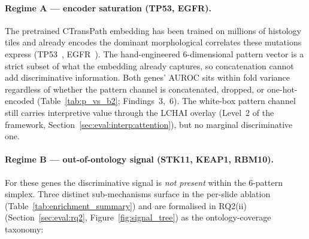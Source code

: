 \paragraph{Regime A --- encoder saturation (TP53, EGFR).}
The pretrained CTransPath embedding has been trained on millions of
histology tiles and already encodes the dominant morphological
correlates these mutations express
(TP53~\cite{ahn2022tp53highgrade},
EGFR~\cite{yoshizawa2013egfrmorph}).
The hand-engineered 6-dimensional pattern vector is a strict subset
of what the embedding already captures, so concatenation cannot
add discriminative information.
Both genes' AUROC sits within fold variance regardless of whether
the pattern channel is concatenated, dropped, or one-hot-encoded
(Table~\ref{tab:p_vs_b2}; Findings~3,~6).
The white-box pattern channel still carries interpretive value
through the LCHAI overlay (Level~2 of the framework,
Section~\ref{sec:eval:interp:attention}), but no marginal
discriminative one.

\paragraph{Regime B --- out-of-ontology signal (STK11, KEAP1,
RBM10).}
For these genes the discriminative signal is \emph{not present}
within the 6-pattern simplex.
Three distinct sub-mechanisms surface in the per-slide ablation
(Table~\ref{tab:enrichment_summary}) and are formalised in RQ2(ii)
(Section~\ref{sec:eval:rq2}, Figure~\ref{fig:signal_tree}) as the
ontology-coverage taxonomy:

